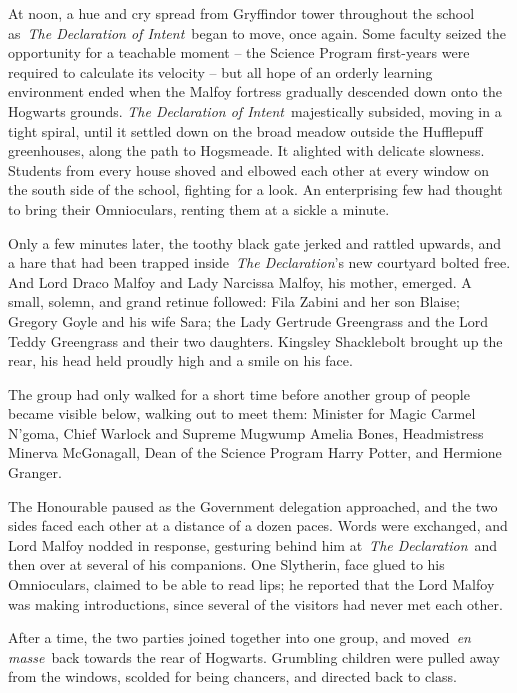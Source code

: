 At noon, a hue and cry spread from Gryffindor tower throughout the
school as~\emph{The Declaration of Intent}~began to move, once again.
Some faculty seized the opportunity for a teachable moment -- the
Science Program first-years were required to calculate its velocity --
but all hope of an orderly learning environment ended when the Malfoy
fortress gradually descended down onto the Hogwarts grounds. \emph{The
Declaration of Intent}~majestically subsided, moving in a tight spiral,
until it settled down on the broad meadow outside the Hufflepuff
greenhouses, along the path to Hogsmeade. It alighted with delicate
slowness. Students from every house shoved and elbowed each other at
every window on the south side of the school, fighting for a look. An
enterprising few had thought to bring their Omnioculars, renting them at
a sickle a minute.

Only a few minutes later, the toothy black gate jerked and rattled
upwards, and a hare that had been trapped inside~\emph{The
Declaration}'s new courtyard bolted free. And Lord Draco Malfoy and Lady
Narcissa Malfoy, his mother, emerged. A small, solemn, and grand retinue
followed: Fila Zabini and her son Blaise; Gregory Goyle and his wife
Sara; the Lady Gertrude Greengrass and the Lord Teddy Greengrass and
their two daughters. Kingsley Shacklebolt brought up the rear, his head
held proudly high and a smile on his face.

The group had only walked for a short time before another group of
people became visible below, walking out to meet them: Minister for
Magic Carmel N'goma, Chief Warlock and Supreme Mugwump Amelia Bones,
Headmistress Minerva McGonagall, Dean of the Science Program Harry
Potter, and Hermione Granger.

The Honourable paused as the Government delegation approached, and the
two sides faced each other at a distance of a dozen paces. Words were
exchanged, and Lord Malfoy nodded in response, gesturing behind him
at~\emph{The Declaration}~and then over at several of his companions.
One Slytherin, face glued to his Omnioculars, claimed to be able to read
lips; he reported that the Lord Malfoy was making introductions, since
several of the visitors had never met each other.

After a time, the two parties joined together into one group, and
moved~\emph{en masse}~back towards the rear of Hogwarts. Grumbling
children were pulled away from the windows, scolded for being chancers,
and directed back to class.

\mybreak

